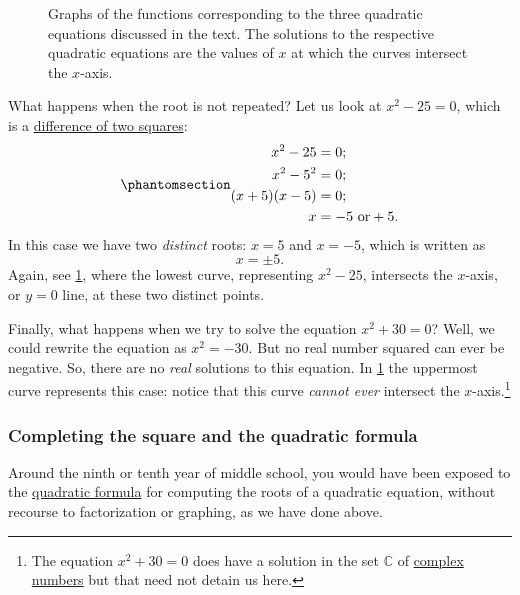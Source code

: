 \documentclass[
  a4paper,
]{article}
\begin{document}
\begin{figure}
\centering

\caption{Graphs of the functions corresponding to the three quadratic
equations discussed in the text. The solutions to the respective
quadratic equations are the values of \(x\) at which the curves
intersect the \(x\)-axis.}\label{fig:quadratic-graphs}
\end{figure}

What happens when the root is not repeated? Let us look at
\(x^2 - 25 = 0\), which is a
\href{https://en.wikipedia.org/wiki/Difference_of_two_squares}{difference
of two squares}:
\begin{equation}\phantomsection\label{eq:plus-minus-five}{
\begin{aligned}
x^2 - 25 &= 0;\\
x^2 -5^2 &= 0;\\
(x + 5)(x - 5) &= 0;\\
x &= -5 \text{ or} +5.\\ 
\end{aligned}
}\end{equation} In this case we have two \emph{distinct} roots:
\(x = 5\) and \(x = -5\), which is written as \[
x = \pm5.
\] Again, see \cref{fig:quadratic-graphs}, where the lowest curve,
representing \(x^2 - 25\), intersects the \(x\)-axis, or \(y=0\) line,
at these two distinct points.

Finally, what happens when we try to solve the equation
\(x^2 + 30 = 0\)? Well, we could rewrite the equation as \(x^2 = -30\).
But no real number squared can ever be negative. So, there are no
\emph{real} solutions to this equation. In \cref{fig:quadratic-graphs}
the uppermost curve represents this case: notice that this curve
\emph{cannot ever} intersect the \(x\)-axis.\footnote{The equation
  \(x^2 + 30 = 0\) does have a solution in the set \(\mathbb{C}\) of
  \href{https://en.wikipedia.org/wiki/Complex_number}{complex numbers}
  but that need not detain us here.}

\subsubsection{Completing the square and the quadratic
formula}\label{completing-the-square-and-the-quadratic-formula}

Around the ninth or tenth year of middle school, you would have been
exposed to the
\href{https://en.wikipedia.org/wiki/Quadratic_formula}{quadratic
formula} for computing the roots of a quadratic equation, without
recourse to factorization or graphing, as we have done above.
\end{document}
